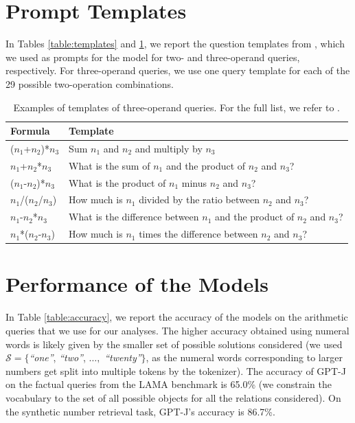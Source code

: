 \documentclass[11pt]{article}
\begin{document}
\section{Prompt Templates}
\label{sec:prompts}
In Tables \ref{table:templates} and \ref{table:templates-3-ops}, we report the question templates from \citet{karpas2022mrkl}, which we used as prompts for the model for two- and three-operand queries, respectively. For three-operand queries, we use one query template for each of the 29 possible two-operation combinations.  %




\begin{table}[ht]\small
    \centering
    \begin{tabular}{ l l }
    \toprule
        \textbf{Formula} &  \textbf{Template} \\ 
        \midrule
        ($n_1$+$n_2$)*$n_3$ & Sum $n_1$ and $n_2$ and multiply by $n_3$ \\ 
        $n_1$+$n_2$*$n_3$ & What is the sum of $n_1$ and the product of $n_2$ and $n_3$? \\ 
        ($n_1$-$n_2$)*$n_3$ & What is the product of $n_1$ minus $n_2$ and $n_3$? \\ 
        $n_1$/($n_2$/$n_3$) & How much is $n_1$ divided by the ratio between $n_2$ and $n_3$? \\ 
        $n_1$-$n_2$*$n_3$ & What is the difference between $n_1$ and the product of $n_2$ and $n_3$? \\ 
        $n_1$*($n_2$-$n_3$) & How much is $n_1$ times the difference between $n_2$ and $n_3$? \\ 
        \bottomrule
    \end{tabular}
    	\caption{Examples of templates of three-operand queries. For the full list, we refer to \citet{karpas2022mrkl}.} \label{table:templates-3-ops}
\end{table}

\section{Performance of the Models}
\label{appendix:accuracy}
In Table \ref{table:accuracy}, we report the accuracy of the models on the arithmetic queries that we use for our analyses. The higher accuracy obtained using numeral words is likely given by the smaller set of possible solutions considered (we used  $\mathcal{S} = \{$\textit{``one''}, \textit{``two''}, $\dots,$ \textit{``twenty''}$ \}$, as the numeral words corresponding to larger numbers get split into multiple tokens by the tokenizer). The accuracy of GPT-J on the factual queries from the LAMA benchmark is 65.0\% (we constrain the vocabulary to the set of all possible objects for all the relations considered). On the synthetic number retrieval task, GPT-J's accuracy is 86.7\%.
\end{document}
